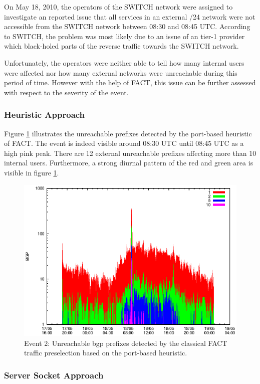 On May 18, 2010, the operators of the SWITCH network were assigned to investigate an reported issue that all services in an external /24 network were not accessible from the SWITCH network between 08:30 and 08:45 UTC. 
According to SWITCH, the problem was most likely due to an issue of an tier-1 provider which black-holed parts of the reverse traffic towards the SWITCH network\citep{SchatzmannPAM2011}.

Unfortunately, the operators were neither able to tell how many internal users were affected nor how many external networks were unreachable during this period of time. 
However with the help of \gls{FACT}, this issue can be further assessed with respect to the severity of the event\citep{SchatzmannPAM2011}.

\subsubsection{Heuristic Approach}

Figure \ref{fig:TIER1_FACT_REF} illustrates the unreachable prefixes detected by the port-based heuristic of \gls{FACT}.
The event is indeed visible around 08:30 UTC until 08:45 UTC as a high pink peak. 
There are 12 external unreachable prefixes affecting more than 10 internal users.
Furthermore, a strong diurnal pattern of the red and green area is visible in figure \ref{fig:TIER1_FACT_REF}. 

\begin{figure}
	[p] \centering 
	\includegraphics[width=0.75\linewidth]{images/events/2010_05_18/bgp_log_port80_ref.eps} \caption{Event 2: Unreachable \gls{bgp} prefixes detected by the classical \gls{FACT} traffic preselection based on the port-based heuristic.} 
	\label{fig:TIER1_FACT_REF} 
\end{figure}

\subsubsection{Server Socket Approach}

